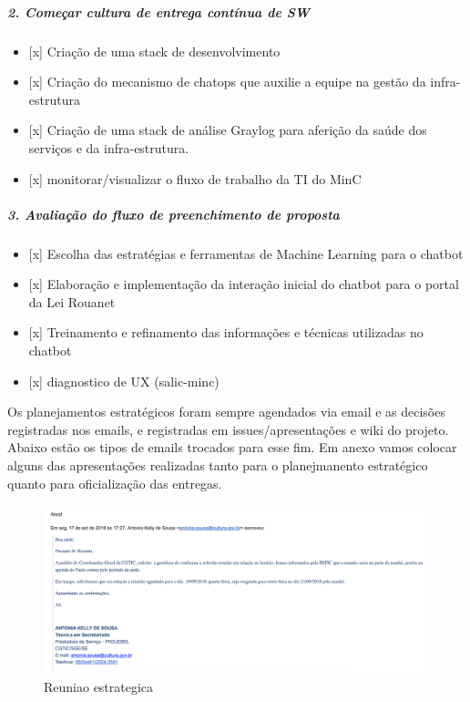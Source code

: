 \hypertarget{comeuxe7ar-cultura-de-entrega-contuxednua-de-sw}{%
\subparagraph{2. Começar cultura de entrega contínua de
SW}\label{comeuxe7ar-cultura-de-entrega-contuxednua-de-sw}}

\begin{itemize}
\tightlist
\item
  {[}x{]} Criação de uma stack de desenvolvimento
\item
  {[}x{]} Criação do mecanismo de chatops que auxilie a equipe na gestão
  da infra-estrutura
\item
  {[}x{]} Criação de uma stack de análise Graylog para aferição da saúde
  dos serviços e da infra-estrutura.
\item
  {[}x{]} monitorar/visualizar o fluxo de trabalho da TI do MinC
\end{itemize}

\hypertarget{avaliauxe7uxe3o-do-fluxo-de-preenchimento-de-proposta}{%
\subparagraph{3. Avaliação do fluxo de preenchimento de
proposta}\label{avaliauxe7uxe3o-do-fluxo-de-preenchimento-de-proposta}}

\begin{itemize}
\tightlist
\item
  {[}x{]} Escolha das estratégias e ferramentas de Machine Learning para
  o chatbot
\item
  {[}x{]} Elaboração e implementação da interação inicial do chatbot
  para o portal da Lei Rouanet
\item
  {[}x{]} Treinamento e refinamento das informações e técnicas
  utilizadas no chatbot
\item
  {[}x{]} diagnostico de UX (salic-minc)
\end{itemize}

Os planejamentos estratégicos foram sempre agendados via email e as
decisões registradas nos emails, e registradas em issues/apresentações e
wiki do projeto. Abaixo estão os tipos de emails trocados para esse fim.
Em anexo vamos colocar alguns das apresentações realizadas tanto para o
planejmanento estratégico quanto para oficialização das entregas.

\begin{figure}
\centering
\includegraphics{figs/estrategico.png}
\caption{Reuniao estrategica}
\end{figure}

